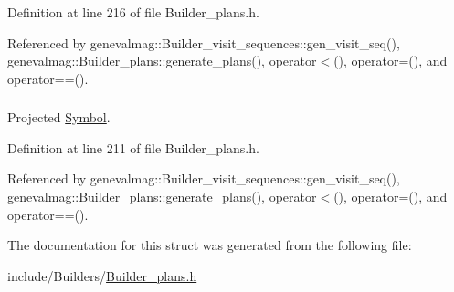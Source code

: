 Definition at line 216 of file Builder\_\-plans.h.

Referenced by genevalmag::Builder\_\-visit\_\-sequences::gen\_\-visit\_\-seq(), genevalmag::Builder\_\-plans::generate\_\-plans(), operator$<$(), operator=(), and operator==().\hypertarget{structgenevalmag_1_1k__p__project_64f5efd91847bd333263c799360dd0b5}{
\subsubsection[{symbol\_\-project}]{}}
\label{structgenevalmag_1_1k__p__project_64f5efd91847bd333263c799360dd0b5}


Projected \hyperlink{classgenevalmag_1_1Symbol}{Symbol}. 



Definition at line 211 of file Builder\_\-plans.h.

Referenced by genevalmag::Builder\_\-visit\_\-sequences::gen\_\-visit\_\-seq(), genevalmag::Builder\_\-plans::generate\_\-plans(), operator$<$(), operator=(), and operator==().

The documentation for this struct was generated from the following file:\begin{CompactItemize}
\item 
include/Builders/\hyperlink{Builder__plans_8h}{Builder\_\-plans.h}\end{CompactItemize}
